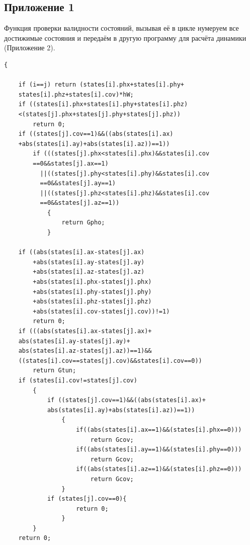 \documentclass[12pt, a4paper]{article}
\begin{document}
\subsection{Приложение 1}
Функция проверки валидности состояний, вызывая её в цикле нумеруем все достижимые состояния и передаём в другую программу для расчёта динамики (Приложение 2).
\begin{lstlisting}
{

    if (i==j) return (states[i].phx+states[i].phy+
    states[i].phz+states[i].cov)*hW;
    if ((states[i].phx+states[i].phy+states[i].phz)
    <(states[j].phx+states[j].phy+states[j].phz))
        return 0;
    if ((states[j].cov==1)&&((abs(states[i].ax)
    +abs(states[i].ay)+abs(states[i].az))==1))
        if (((states[j].phx<states[i].phx)&&states[i].cov
        ==0&&states[j].ax==1)
          ||((states[j].phy<states[i].phy)&&states[i].cov
          ==0&&states[j].ay==1)
          ||((states[j].phz<states[i].phz)&&states[i].cov
          ==0&&states[j].az==1))
            {
                return Gpho;
            }

    if ((abs(states[i].ax-states[j].ax)
        +abs(states[i].ay-states[j].ay)
        +abs(states[i].az-states[j].az)
        +abs(states[i].phx-states[j].phx)
        +abs(states[i].phy-states[j].phy)
        +abs(states[i].phz-states[j].phz)
        +abs(states[i].cov-states[j].cov))!=1)
        return 0;
    if (((abs(states[i].ax-states[j].ax)+
    abs(states[i].ay-states[j].ay)+
    abs(states[i].az-states[j].az))==1)&&
    ((states[i].cov==states[j].cov)&&states[i].cov==0))
        return Gtun;
    if (states[i].cov!=states[j].cov)
        {
            if ((states[j].cov==1)&&((abs(states[i].ax)+
            abs(states[i].ay)+abs(states[i].az))==1))
                {
                    if((abs(states[i].ax==1)&&(states[i].phx==0))) 
                    	return Gcov;
                    if((abs(states[i].ay==1)&&(states[i].phy==0))) 
                    	return Gcov;
                    if((abs(states[i].az==1)&&(states[i].phz==0))) 
                    	return Gcov;
                }
            if (states[j].cov==0){
                    return 0;
                }
        }
    return 0;
\end{lstlisting}
\end{document}
